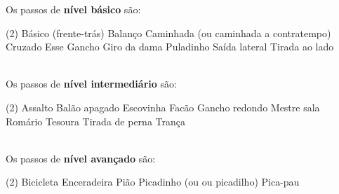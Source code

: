Os passos de \textbf{nível básico} são:
\begin{tasks}(2)
\task Básico (frente-trás)
\task Balanço 
\task Caminhada (ou caminhada a contratempo)
\task Cruzado
\task Esse
\task Gancho
\task Giro da dama
\task Puladinho
\task Saída lateral
\task Tirada ao lado
\end{tasks}~\\


Os passos de \textbf{nível intermediário} são:
\begin{tasks}(2)
\task Assalto
\task Balão apagado
\task Escovinha
\task Facão
\task Gancho redondo
\task Mestre sala
\task Romário
\task Tesoura
\task Tirada de perna
\task Trança
\end{tasks}~\\

Os passos de \textbf{nível avançado} são:
\begin{tasks}(2)
\task Bicicleta
\task Enceradeira
\task Pião
\task Picadinho (ou ou picadilho)
\task Pica-pau
\end{tasks}

